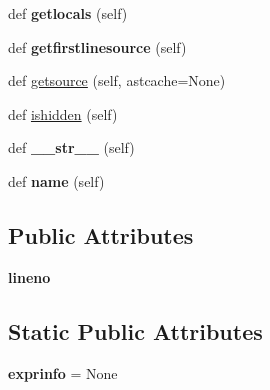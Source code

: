 \begin{DoxyCompactItemize}
\item 
\mbox{\label{class__pytest_1_1__code_1_1code_1_1_traceback_entry_a9897796279bb7eecfe58b3045818469d}} 
def {\bfseries getlocals} (self)
\item 
\mbox{\label{class__pytest_1_1__code_1_1code_1_1_traceback_entry_acf7fcc74aa3f1d056304b2815a3d5c90}} 
def {\bfseries getfirstlinesource} (self)
\item 
def \hyperlink{class__pytest_1_1__code_1_1code_1_1_traceback_entry_a9084b17e96372ff93cfe7f7fadccf6ad}{getsource} (self, astcache=None)
\item 
def \hyperlink{class__pytest_1_1__code_1_1code_1_1_traceback_entry_a899dc2345ad8f1b03a7cfc2719f0d77e}{ishidden} (self)
\item 
\mbox{\label{class__pytest_1_1__code_1_1code_1_1_traceback_entry_ab5b0acfb3b5432f1aab2fe3730c8ea43}} 
def {\bfseries \+\_\+\+\_\+str\+\_\+\+\_\+} (self)
\item 
\mbox{\label{class__pytest_1_1__code_1_1code_1_1_traceback_entry_aea7496a3c5c7d2a81a05fb2bf14429a3}} 
def {\bfseries name} (self)
\end{DoxyCompactItemize}
\subsection*{Public Attributes}
\begin{DoxyCompactItemize}
\item 
\mbox{\label{class__pytest_1_1__code_1_1code_1_1_traceback_entry_ac447c68d6338b33e0acf51a3e2be396f}} 
{\bfseries lineno}
\end{DoxyCompactItemize}
\subsection*{Static Public Attributes}
\begin{DoxyCompactItemize}
\item 
\mbox{\label{class__pytest_1_1__code_1_1code_1_1_traceback_entry_aefb7c16a9e64c5d05abb713cbc1791a9}} 
{\bfseries exprinfo} = None
\end{DoxyCompactItemize}
